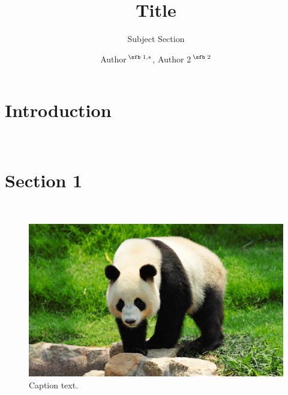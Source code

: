 \documentclass{bioinfo}
\begin{document}


\subtitle{Subject Section}

\title[Title]{Title}
\author[Sample \textit{et~al}.]{Author\,$^{\text{\sfb 1,}*}$, Author 2\,$^{\text{\sfb 2}}$}
\address{$^{\text{\sf 1}}$Address, \\
$^{\text{\sf 2}}$Address 2}




\abstract{\blindtext}

\maketitle

\section{Introduction}

\blindtext\\

\section{Section 1}

\blindtext\\

\begin{figure}[!tpb]
\centerline{\includegraphics[width=\columnwidth]{panda.jpg}}
\caption{Caption text. 
\label{panda}}
\end{figure}
\end{document}
